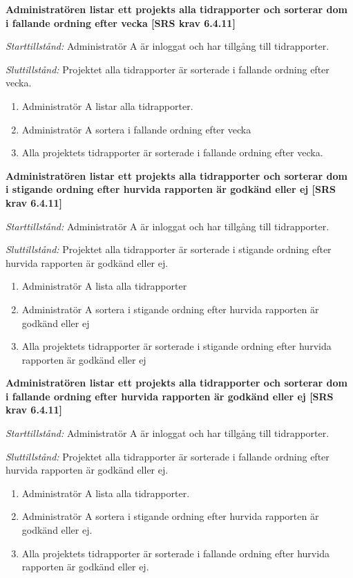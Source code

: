 \documentclass[a4paper]{article}
\begin{document}
\begin{FT}
\item %
\textbf{Administratören listar ett projekts alla tidrapporter och sorterar dom i fallande ordning efter vecka [SRS krav 6.4.11]}

\emph{Starttillstånd:} Administratör A är inloggat och har tillgång till tidrapporter.

\emph{Sluttillstånd:} Projektet alla tidrapporter är sorterade i fallande ordning efter vecka.

\begin{enumerate}
\item Administratör A listar alla tidrapporter.
\item Administratör A sortera i fallande ordning efter vecka
\item Alla projektets tidrapporter är sorterade i fallande ordning efter vecka.
\end{enumerate}

\item %
\textbf{Administratören listar ett projekts alla tidrapporter och sorterar dom i stigande ordning efter hurvida rapporten är godkänd eller ej [SRS krav 6.4.11]}

\emph{Starttillstånd:} Administratör A är inloggat och har tillgång till tidrapporter.

\emph{Sluttillstånd:} Projektet alla tidrapporter är sorterade i stigande ordning efter hurvida rapporten är godkänd eller ej.

\begin{enumerate}
\item Administratör A lista alla tidrapporter
\item Administratör A sortera i stigande ordning efter hurvida rapporten är godkänd eller ej
\item Alla projektets tidrapporter är sorterade i stigande ordning efter hurvida rapporten är godkänd eller ej
\end{enumerate}

\item %
\textbf{Administratören listar ett projekts alla tidrapporter och sorterar dom i fallande ordning efter hurvida rapporten är godkänd eller ej [SRS krav 6.4.11]}

\emph{Starttillstånd:} Administratör A är inloggat och har tillgång till tidrapporter.

\emph{Sluttillstånd:} Projektet alla tidrapporter är sorterade i fallande ordning efter hurvida rapporten är godkänd eller ej.

\begin{enumerate}
\item Administratör A lista alla tidrapporter.
\item Administratör A sortera i stigande ordning efter hurvida rapporten är godkänd eller ej.
\item Alla projektets tidrapporter är sorterade i fallande ordning efter hurvida rapporten är godkänd eller ej.
\end{enumerate}


\end{FT}
\end{document}
